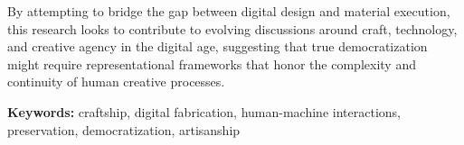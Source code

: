 \vspace{0.5cm}

By attempting to bridge the gap between digital design and material execution, this research looks to contribute to evolving discussions around craft, technology, and creative agency in the digital age, suggesting that true democratization might require representational frameworks that honor the complexity and continuity of human creative processes.

\vspace{1cm}

\noindent
\textbf{Keywords:} craftship, digital fabrication, human-machine interactions, preservation, democratization, artisanship

\vspace{\fill}